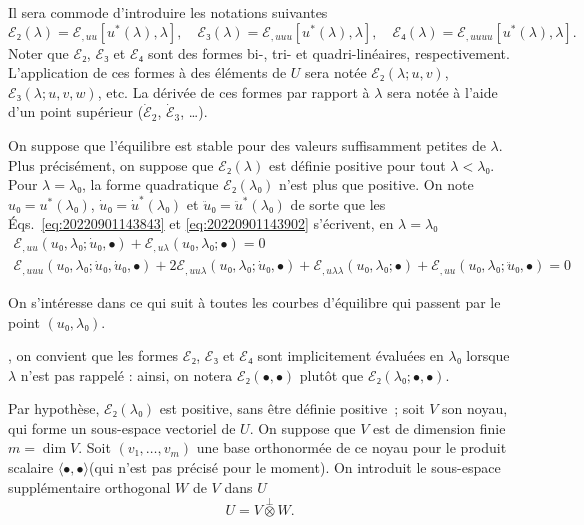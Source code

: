 \documentclass[12pt, final]{scrartcl}
\theoremstyle{definition}
\begin{document}
Il sera commode d'introduire les notations suivantes
\begin{equation}
  ℰ₂(λ) = ℰ_{,uu}[u^{\ast}(λ), λ], \quad ℰ₃(λ) = ℰ_{,uuu}[u^{\ast}(λ), λ], \quad ℰ₄(λ) = ℰ_{,uuuu} [u^{\ast}(λ), λ].
\end{equation}
Noter que \(ℰ₂\), \(ℰ₃\) et \(ℰ₄\) sont des formes bi-, tri- et
quadri-linéaires, respectivement. L'application de ces formes à des éléments de
\(U\) sera notée \(ℰ₂(λ; u, v)\), \(ℰ₃(λ; u, v, w)\), etc. La dérivée de ces
formes par rapport à \(λ\) sera notée à l'aide d'un point supérieur
(\(\dot{ℰ}_2\), \(\dot{ℰ}_3\), \dots).

On suppose que l'équilibre est stable pour des valeurs suffisamment petites de
\(λ\). Plus précisément, on suppose que \(ℰ₂(λ)\) est définie positive pour tout
\(λ < λ₀\). Pour \(λ = λ₀\), la forme quadratique \(ℰ₂(λ₀)\) n'est plus que
positive. On note \(u₀ = u^{\ast}(λ₀)\), \(\dot{u}₀ = \dot{u}^\ast(λ₀)\) et
\(\ddot{u}₀ = \ddot{u}^\ast(λ₀)\) de sorte que les
Éqs.~\eqref{eq:20220901143843} et \eqref{eq:20220901143902} s'écrivent, en
\(λ = λ₀\)
\begin{gather}
  \label{eq:20220901144331}
  ℰ_{,uu}(u₀, λ₀; \dot{u}₀, \bullet) + ℰ_{,uλ}(u₀, λ₀; \bullet) = 0\\
  \label{eq:20220901144335}
  ℰ_{,uuu}(u₀, λ₀; \dot{u}₀, \dot{u}₀, \bullet) + 2ℰ_{,uuλ}(u₀, λ₀; \dot{u}₀, \bullet) + ℰ_{,uλλ}(u₀, λ₀; \bullet) + ℰ_{,uu}(u₀, λ₀; \ddot{u}₀, \bullet) = 0
\end{gather}

On s'intéresse dans ce qui suit à toutes les courbes d'équilibre qui passent par
le point \((u₀, λ₀)\).

, on
convient que les formes \(ℰ₂\), \(ℰ₃\) et \(ℰ₄\) sont implicitement évaluées en
\(λ₀\) lorsque \(λ\) n'est pas rappelé : ainsi, on notera \(ℰ₂(•, •)\) plutôt
que \(ℰ₂(λ₀ ; •, •)\).

Par hypothèse, \(ℰ₂(λ₀)\) est positive, sans être définie
positive~; soit \(V\) son noyau, qui forme un sous-espace vectoriel de \(U\). On
suppose que \(V\) est de dimension finie \(m = \dim V\). Soit
\((v₁, \ldots, v_m)\) une base orthonormée de ce noyau pour le produit scalaire
\(〈 •, • 〉\)(qui n'est pas précisé pour le moment). On introduit le
sous-espace supplémentaire orthogonal \(W\) de \(V\) dans \(U\)
\begin{equation}
  U = V \overset{\perp}{\otimes} W.
\end{equation}
\end{document}
